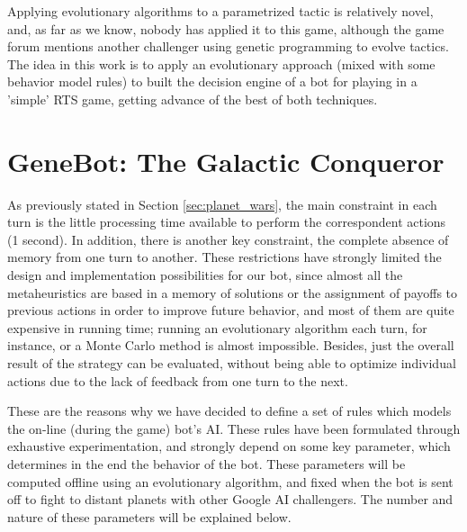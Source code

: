 \documentclass{llncs}
\begin{document}

Applying evolutionary algorithms to a parametrized tactic is
relatively novel, and, as far as we know, nobody has applied it to
this game, although the game forum mentions another challenger using
genetic programming to evolve tactics. The idea in this work is to
apply an evolutionary approach (mixed with 
some behavior model rules) to built the decision engine of a bot for
playing in a 'simple' RTS game, getting advance of the best of both
techniques. 


%
\section{GeneBot: The Galactic Conqueror}
\label{sec:genebot}
%

As previously stated in Section \ref{sec:planet_wars}, the main
constraint in each turn is the little processing time
available to perform the correspondent actions (1 second). In
addition, there is another key constraint, the complete
absence of memory from one turn to another. These restrictions have
strongly limited the design and implementation possibilities for our
bot, since almost all the metaheuristics are based in a memory of
solutions or the assignment of payoffs to previous actions in order to
improve future behavior, and most of them are quite expensive in
running time; running an evolutionary algorithm each turn, for
instance, or a Monte Carlo method is almost impossible. Besides, just
the overall result of the strategy can be evaluated, 
without being able to optimize individual actions due to the lack of
feedback from one turn to the next. 

These are the reasons why we have decided to define a set of rules
which models the on-line (during the game) bot's AI. These rules have
been formulated through exhaustive experimentation, and strongly
depend on some key parameter, which determines in the end the
behavior of the bot. 
These parameters will be computed offline using an evolutionary
algorithm, and fixed when the bot is sent off to fight to distant
planets with other Google AI challengers. The number and nature of
these parameters will be explained below. 
\end{document}
